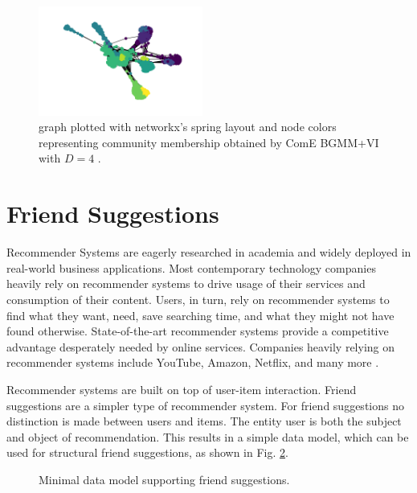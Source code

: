 \documentclass[conference]{IEEEtran}
\begin{document}
\begin{figure}[htbp]
    \centering
    \includegraphics[width=0.48\textwidth]{images/fb/graph_d4.png}
    \caption{\citet{social_circles_fb} graph plotted with networkx's spring layout and node colors representing community membership obtained by ComE BGMM+VI with $D=4$ \cite{networkx}.}
    \label{fig:fb_graph}
\end{figure}


\section{Friend Suggestions}

Recommender Systems are eagerly researched in academia and widely deployed in real-world business applications. Most contemporary technology companies heavily rely on recommender systems to drive usage of their services and consumption of their content. Users, in turn, rely on recommender systems to find what they want, need, save searching time, and what they might not have found otherwise. State-of-the-art recommender systems provide a competitive advantage desperately needed by online services. Companies heavily relying on recommender systems include YouTube, Amazon, Netflix, and many more \cite{Rocca19}.

Recommender systems are built on top of user-item interaction. Friend suggestions are a simpler type of recommender system. For friend suggestions no distinction is made between users and items. The entity user is both the subject and object of recommendation. This results in a simple data model, which can be used for structural friend suggestions, as shown in Fig. \ref{fig:data_model}.

\begin{figure}[htbp]
    \centering
    \caption{Minimal data model supporting friend suggestions.}
    \label{fig:data_model}
\end{figure}
\end{document}
